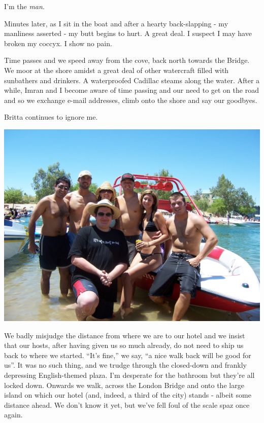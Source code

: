 \documentclass[a5paper,titlepage,11pt,draft]{book}
\begin{document}
I'm the \emph{man}.

Minutes later, as I sit in the boat and after a hearty back-slapping - my manliness asserted - my butt begins to hurt.  A great deal.  I suspect I may have broken my coccyx.  I show no pain.

Time passes and we speed away from the cove, back north towards the Bridge.  We moor at the shore amidst a great deal of other watercraft filled with sunbathers and drinkers.  A waterproofed Cadillac steams along the water.  After a while, Imran and I become aware of time passing and our need to get on the road and so we exchange e-mail addresses, climb onto the shore and say our goodbyes.

Britta continues to ignore me.

\begin{center}\includegraphics[width=\textwidth]{gfx/100_1604}\end{center}

We badly misjudge the distance from where we are to our hotel and we insist that our hosts, after having given us so much already, do not need to ship us back to where we started.  ``It's fine,'' we say, ``a nice walk back will be good for us''.  It was no such thing, and we trudge through the closed-down and frankly depressing English-themed plaza.  I'm desperate for the bathroom but they're all locked down.  Onwards we walk, across the London Bridge and onto the large island on which our hotel (and, indeed, a third of the city) stands - albeit some distance ahead.  We don't know it yet, but we've fell foul of the scale spaz once again.
\end{document}
